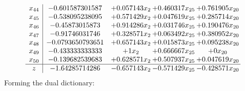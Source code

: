 \documentclass[11pt]{article}
\begin{document}
\[\begin{array}{c| c c@{\hskip 2pt} c@{\hskip 2pt} c@{\hskip 2pt} }
 x_{44}   &  -0.601587301587 & + 0.057143 x_{2} & + 0.460317 x_{25} & + 0.761905 x_{20}\\
 x_{45}   &  -0.538095238095 & + 0.571429 x_{2} & + 0.047619 x_{25} & + 0.285714 x_{20}\\
 x_{46}   &  -0.45873015873 & + 0.914286 x_{2} & + 0.031746 x_{25} & + 0.190476 x_{20}\\
 x_{47}   &  -0.91746031746 & + 0.328571 x_{2} & + 0.063492 x_{25} & + 0.380952 x_{20}\\
 x_{48}   &  -0.0793650793651 & + 0.657143 x_{2} & + 0.015873 x_{25} & + 0.095238 x_{20}\\
 x_{49}   &  -0.433333333333 & + 1 x_{2} & + 0.666667 x_{25} & + 0 x_{20}\\
 x_{50}   &  -0.139682539683 & + 0.628571 x_{2} & + 0.507937 x_{25} & + 0.047619 x_{20}\\
\hline
z    &  -1.64285714286 & -0.657143 x_{2} & -0.571429 x_{25} & -0.428571 x_{20}\\
\end{array}\]
Forming the dual dictionary:
\end{document}
